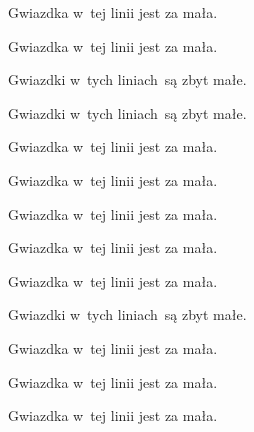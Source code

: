 \documentclass[a4paper,11pt]{article}
\begin{document}
\start {} Gwiazdka w~tej linii jest za mała.

\vspace{\spaceFour}


\start {} Gwiazdka w~tej linii jest za mała.

\vspace{\spaceFour}


\start {} Gwiazdki w~tych
liniach~są zbyt małe.

\vspace{\spaceFour}


\start {} Gwiazdki w~tych
liniach~są zbyt małe.

\vspace{\spaceFour}


\start {} Gwiazdka w~tej linii jest za mała.

\vspace{\spaceFour}


\start {} Gwiazdka w~tej linii jest za mała.

\vspace{\spaceFour}


\start {} Gwiazdka w~tej linii jest za mała.

\vspace{\spaceFour}


\start {} Gwiazdka w~tej linii jest za mała.

\vspace{\spaceFour}


\start {} Gwiazdka w~tej linii jest za mała.

\vspace{\spaceFour}


\start {} Gwiazdki w~tych
liniach~są zbyt małe.

\vspace{\spaceFour}


\start {} Gwiazdka w~tej linii jest za mała.

\vspace{\spaceFour}


\start {} Gwiazdka w~tej linii jest za mała.

\vspace{\spaceFour}


\start {} Gwiazdka w~tej linii jest za mała.

\vspace{\spaceFour}
\end{document}
